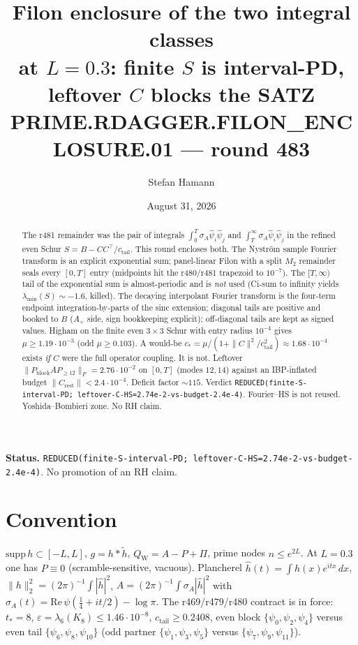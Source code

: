\documentclass[11pt]{article}
\title{\bfseries Filon enclosure of the two integral classes\\[2mm]
at $L=0.3$: finite $S$ is interval-PD,\\[1mm]
leftover $C$ blocks the SATZ\\[2mm]
\large PRIME.RDAGGER.FILON\_ENCLOSURE.01 --- round 483}
\author{Stefan Hamann}
\date{August 31, 2026}
\theoremstyle{remark}
\newcommand{\QW}{Q_{\mathrm W}}
\begin{document}
\maketitle

\begin{abstract}\noindent
The r481 remainder was the pair of integrals
$\int_0^T\sigma_A\hat\psi_i\hat\psi_j$ and
$\int_T^\infty\sigma_A\hat\psi_i\hat\psi_j$
in the refined even Schur
$S=B-CC^\top/c_{\mathrm{tail}}$.
This round encloses both.
The Nystr\"om sample Fourier transform is an explicit
exponential sum; panel-linear Filon with a split
$M_2$ remainder seals every $[0,T]$ entry
(midpoints hit the r480/r481 trapezoid to $10^{-7}$).
The $[T,\infty)$ tail of the exponential sum is
almost-periodic and is \emph{not} used
(Ci-sum to infinity yields $\lambda_{\min}(S)\sim-1.6$,
killed).
The decaying interpolant Fourier transform is the
four-term endpoint integration-by-parts of the sinc
extension; diagonal tails are positive and booked to $B$
($A_+$ side, sign bookkeeping explicit); off-diagonal
tails are kept as signed values.
Higham on the finite even $3\times3$ Schur with entry
radius $10^{-4}$ gives $\mu\ge1.19\cdot10^{-3}$
(odd $\mu\ge0.103$).
A would-be
$c_*=\mu/(1+\|C\|^2/c_{\mathrm{tail}}^2)\approx1.68\cdot10^{-4}$
exists \emph{if} $C$ were the full operator coupling.
It is not.
Leftover $\|P_{\mathrm{block}}A P_{\ge12}\|_F=2.76\cdot10^{-2}$
on $[0,T]$ (modes $12,14$) against an IBP-inflated budget
$\|C_{\mathrm{rest}}\|<2.4\cdot10^{-4}$.
Deficit factor $\sim115$.
Verdict
\texttt{REDUCED(finite-S-interval-PD; leftover-C-HS=2.74e-2-vs-budget-2.4e-4)}.
Fourier--HS is not reused.
Yoshida--Bombieri zone.  No RH claim.
\end{abstract}

\medskip\noindent
\textbf{Status.}\enspace
\texttt{REDUCED(finite-S-interval-PD; leftover-C-HS=2.74e-2-vs-budget-2.4e-4)}.
No promotion of an RH claim.

\begin{center}
\end{center}

\section{Convention}

$\mathrm{supp}\,h\subset[-L,L]$, $g=h*\widetilde h$,
$\QW=A-P+\Pi$, prime nodes $n\le e^{2L}$.
At $L=0.3$ one has $P\equiv0$ (scramble-sensitive,
vacuous).
Plancherel $\hat h(t)=\int h(x)e^{itx}\,dx$,
$\|h\|_2^2=(2\pi)^{-1}\int|\hat h|^2$,
$A=(2\pi)^{-1}\int\sigma_A|\hat h|^2$ with
$\sigma_A(t)=\mathrm{Re}\,\psi(\tfrac14+it/2)-\log\pi$.
The r469/r479/r480 contract is in force:
$t_*=8$, $\varepsilon=\lambda_6(K_8)\le1.46\cdot10^{-8}$,
$c_{\mathrm{tail}}\ge0.2408$,
even block $\{\psi_0,\psi_2,\psi_4\}$ versus
even tail $\{\psi_6,\psi_8,\psi_10\}$
(odd partner $\{\psi_1,\psi_3,\psi_5\}$ versus
$\{\psi_7,\psi_9,\psi_{11}\}$).
\end{document}
